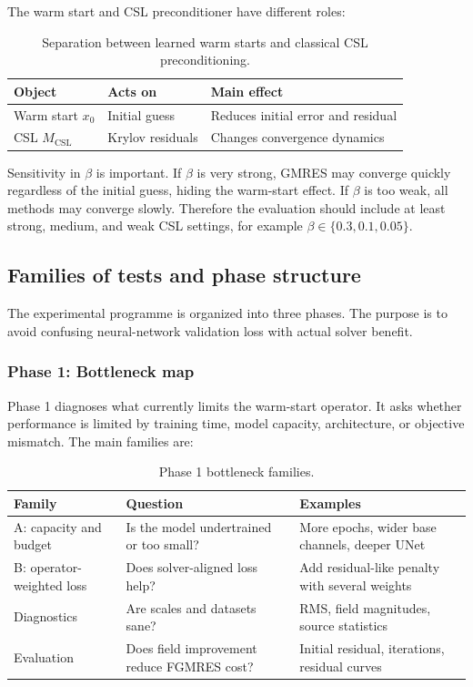 The warm start and CSL preconditioner have different roles:
\begin{table}[h]
\centering
\begin{tabular}{lll}
\toprule
Object & Acts on & Main effect \\
\midrule
Warm start $x_0$ & Initial guess & Reduces initial error and residual \\
CSL $M_{\mathrm{CSL}}$ & Krylov residuals & Changes convergence dynamics \\
\bottomrule
\end{tabular}
\caption{Separation between learned warm starts and classical CSL
preconditioning.}
\label{tab:twod_warmstart_vs_csl}
\end{table}

Sensitivity in $\beta$ is important. If $\beta$ is very strong, GMRES may
converge quickly regardless of the initial guess, hiding the warm-start
effect. If $\beta$ is too weak, all methods may converge slowly. Therefore
the evaluation should include at least strong, medium, and weak CSL settings,
for example $\beta \in \{0.3,0.1,0.05\}$.


\subsection{Families of tests and phase structure}
\label{subsec:methodology_2d_families_phases}

The experimental programme is organized into three phases. The purpose is to
avoid confusing neural-network validation loss with actual solver benefit.

\subsubsection{Phase 1: Bottleneck map}

Phase 1 diagnoses what currently limits the warm-start operator. It asks
whether performance is limited by training time, model capacity, architecture,
or objective mismatch. The main families are:
\begin{table}[h]
\centering
\begin{tabular}{lll}
\toprule
Family & Question & Examples \\
\midrule
A: capacity and budget &
Is the model undertrained or too small? &
More epochs, wider base channels, deeper UNet \\
B: operator-weighted loss &
Does solver-aligned loss help? &
Add residual-like penalty with several weights \\
Diagnostics &
Are scales and datasets sane? &
RMS, field magnitudes, source statistics \\
Evaluation &
Does field improvement reduce FGMRES cost? &
Initial residual, iterations, residual curves \\
\bottomrule
\end{tabular}
\caption{Phase 1 bottleneck families.}
\label{tab:twod_phase1_families}
\end{table}

